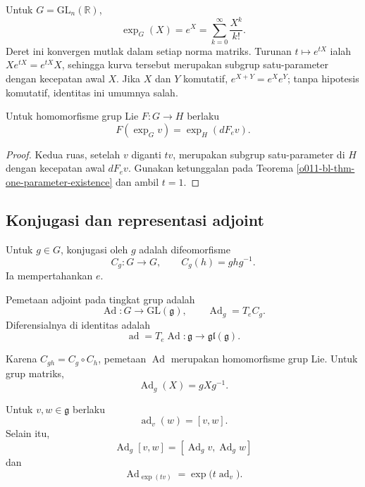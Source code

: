 \begin{beispiel}\label{o011-bl-ex-matrix-exp}
Untuk $G=\mathrm{GL}_n(\mathbb R)$,
\[
  \exp_G(X)=e^X=\sum_{k=0}^{\infty}\frac{X^k}{k!}.
\]
Deret ini konvergen mutlak dalam setiap norma matriks. Turunan
$t\mapsto e^{tX}$ ialah $Xe^{tX}=e^{tX}X$, sehingga kurva tersebut merupakan
subgrup satu-parameter dengan kecepatan awal $X$. Jika $X$ dan $Y$ komutatif,
$e^{X+Y}=e^Xe^Y$; tanpa hipotesis komutatif, identitas ini umumnya salah.
\end{beispiel}

\begin{Proposition}\label{o011-bl-prop-exp-natural}
Untuk homomorfisme grup Lie $F\colon G\to H$ berlaku
\[
  F(\exp_G v)=\exp_H(dF_e v).
\]
\end{Proposition}

\begin{proof}
Kedua ruas, setelah $v$ diganti $tv$, merupakan subgrup satu-parameter di $H$
dengan kecepatan awal $dF_e v$. Gunakan ketunggalan pada Teorema
\ref{o011-bl-thm-one-parameter-existence} dan ambil $t=1$.
\end{proof}

\subsection{Konjugasi dan representasi adjoint}

Untuk $g\in G$, konjugasi oleh $g$ adalah difeomorfisme
\[
  C_g\colon G\longrightarrow G,
  \qquad C_g(h)=ghg^{-1}.
\]
Ia mempertahankan $e$.

\begin{definition}\label{o011-bl-def-adjoint}
Pemetaan adjoint pada tingkat grup adalah
\[
  \operatorname{Ad}\colon G\longrightarrow\mathrm{GL}(\mathfrak g),
  \qquad \operatorname{Ad}_g=T_eC_g.
\]
Diferensialnya di identitas adalah
\[
  \operatorname{ad}=T_e\operatorname{Ad}\colon
  \mathfrak g\longrightarrow\mathfrak{gl}(\mathfrak g).
\]
\end{definition}

Karena $C_{gh}=C_g\circ C_h$, pemetaan $\operatorname{Ad}$ merupakan
homomorfisme grup Lie. Untuk grup matriks,
\[
  \operatorname{Ad}_g(X)=gXg^{-1}.
\]

\begin{Theorem}\label{o011-bl-thm-ad-bracket}
Untuk $v,w\in\mathfrak g$ berlaku
\[
  \operatorname{ad}_v(w)=[v,w].
\]
Selain itu,
\[
  \operatorname{Ad}_g[v,w]
  =[\operatorname{Ad}_gv,\operatorname{Ad}_gw]
\]
dan
\[
  \operatorname{Ad}_{\exp(tv)}
  =\exp\bigl(t\operatorname{ad}_v\bigr).
\]
\end{Theorem}

